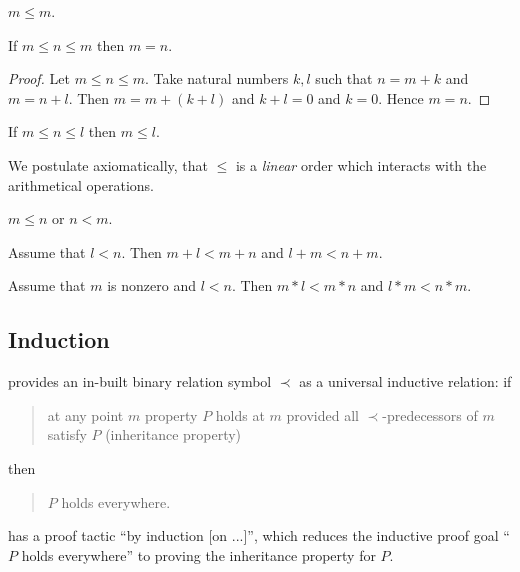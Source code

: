 \documentclass[english,11pt]{article}
\begin{document}
\begin{forthel}

\begin{lemma}
$m \leq m$.
\end{lemma}

\begin{lemma}
If $m \leq n \leq m$ then $m = n$.
\end{lemma}
\begin{proof}
Let $m \leq n \leq m$.
Take natural numbers $k,l$ such that
$n = m + k$ and $m = n + l$.
Then $m = m + (k + l)$ and $k + l = 0$ and $k = 0$.
Hence $m = n$.
\end{proof}

\begin{lemma}
If $m \leq n \leq l$ then  $m \leq l$.
\end{lemma}
\end{forthel}
We postulate axiomatically, that $\leq$ is a \textit{linear} order which interacts
with the arithmetical operations.
\begin{forthel}
\begin{axiom}
$m \leq n$ or $n < m$.
\end{axiom}

\begin{lemma}
Assume that $l < n$.
Then $m + l < m + n$ and $l + m < n + m$.
\end{lemma}

\begin{lemma}
Assume that $m$ is nonzero and $l < n$.
Then $m * l < m * n$ and $l * m < n * m$.
\end{lemma}
\end{forthel}


\subsection{Induction}

\Naproche provides an in-built binary relation
symbol $\prec$ as a universal inductive relation: if 

\begin{quote}
at any
point $m$ property $P$ holds at $m$ provided all
$\prec$-predecessors of $m$ satisfy $P$ (inheritance property)
\end{quote} 
then 
\begin{quote}
$P$ holds everywhere.
\end{quote}

\Naproche has a proof tactic ``by induction [on ...]'', which 
reduces the inductive proof goal ``$P$ holds everywhere'' 
to proving the inheritance property for $P$.
\end{document}
